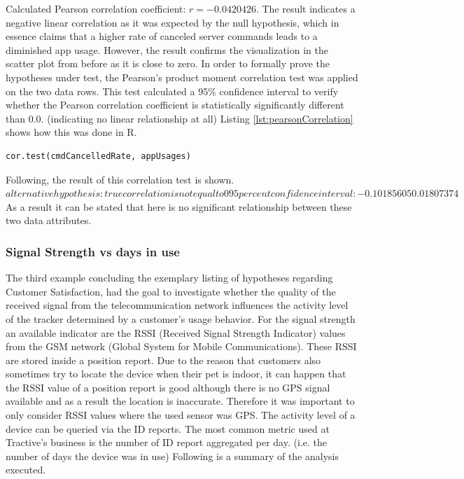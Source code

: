 \begin{enumerate}
	Calculated Pearson correlation coefficient: $r = -0.0420426$. 
	The result indicates a negative linear correlation as it was expected by the null hypothesis, which in essence claims that a higher rate of canceled server commands leads to a diminished app usage. However, the result confirms the visualization in the scatter plot from before as it is close to zero.
	In order to formally prove the hypotheses under test, the Pearson's product moment correlation test was applied on the two data rows. This test calculated a 95\% confidence interval to verify whether the Pearson correlation coefficient is statistically significantly different than $0.0$. (indicating no linear relationship at all) Listing \ref{lst:pearsonCorrelation} shows how this was done in R. 
	
	\begin{lstlisting}[caption={Pearson correlation test in R}, label={lst:pearsonCorrelation}]
	cor.test(cmdCancelledRate, appUsages)
	\end{lstlisting}
	
	Following, the result of this correlation test is shown.
	$
	alternative hypothesis: true correlation is not equal to 0
	95 percent confidence interval:
	-0.10185605  0.01807374
	$
	As a result it can be stated that here is no significant relationship between these two data attributes. 
\end{enumerate}

\subsubsection{Signal Strength vs days in use}
The third example concluding the exemplary listing of hypotheses regarding Customer Satisfaction, had the goal to investigate whether the quality of the received signal from the telecommunication network influences the activity level of the tracker determined by a customer's usage behavior. For the signal strength an available indicator are the RSSI (Received Signal Strength Indicator) values from the GSM network (Global System for Mobile Communications). These RSSI are stored inside a position report. Due to the reason that customers also sometimes try to locate the device when their pet is indoor, it can happen that the RSSI value of a position report is good although there is no GPS signal available and as a result the location is inaccurate. Therefore it was important to only consider RSSI values where the used sensor was GPS. The activity level of a device can be queried via the ID reports. The most common metric used at Tractive's business is the number of ID report aggregated per day. (i.e. the number of days the device was in use) Following is a summary of the analysis executed. 

